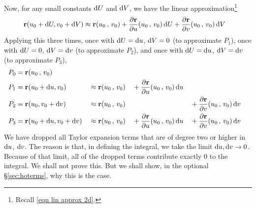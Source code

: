 Now, for any small constants $\mathrm{d}U$ and $\mathrm{d}V$, we have the linear
approximation\footnote{Recall \eqref{eqn lin approx 2d}.}
\begin{align*}
\vr(u_0+\dee{U},v_0+\dee{V})
&\approx \vr(u_0\,,\,v_0)
   +\pdiff{\vr}{u}(u_0\,,\,v_0)\,\dee{U}
   +\pdiff{\vr}{v}(u_0\,,\,v_0)\,\dee{V}
\end{align*}
Applying this three times, 
once with $\mathrm{d}U=\mathrm{d}u$, $\mathrm{d}V=0$ (to approximate $P_1$),
once with $\mathrm{d}U=0$, $\mathrm{d}V=\mathrm{d}v$ (to approximate $P_2$), 
and once with  $\mathrm{d}U=\mathrm{d}u$, $\mathrm{d}V=\mathrm{d}v$ (to approximate $P_3$),
\begin{alignat*}{5}
P_0&=\vr(u_0\,,\,v_0) \\
P_1&=\vr(u_0+\dee{u}, v_0)
   &&\approx \vr(u_0\,,\,v_0)
   &&+\pdiff{\vr}{u}(u_0\,,\,v_0)\,\dee{u} \\
P_2&=\vr(u_0, v_0+\dee{v})
   &&\approx \vr(u_0\,,\,v_0) &&
   &&+\pdiff{\vr}{v}(u_0\,,\,v_0)\,\dee{v} \\
P_3&=\vr(u_0+\dee{u}, v_0+\dee{v})
   &&\approx\vr(u_0\,,\,v_0)
   &&+\pdiff{\vr}{u}(u_0\,,\,v_0)\,\dee{u}
   &&+\pdiff{\vr}{v}(u_0\,,\,v_0)\,\dee{v} 
\end{alignat*}
We have dropped all Taylor expansion terms that are of degree two or higher 
in $\mathrm{d}u$, $\mathrm{d}v$. The reason is that, in defining the integral, we take 
the limit $\mathrm{d}u,\mathrm{d}v\rightarrow 0$. Because of that limit, 
all of the dropped terms contribute exactly $0$ to the integral. 
We shall not prove this. But we shall show, in the optional
\S\ref{sec:hoterms}, why this is the case.  

